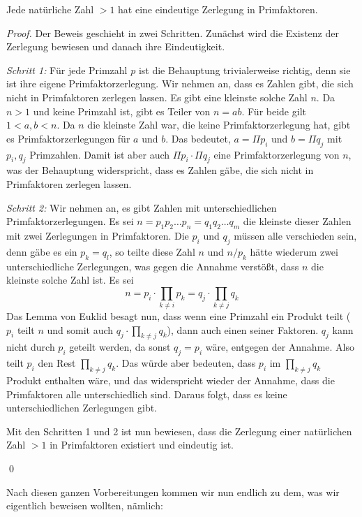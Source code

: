 \begin{lemma}\label{lem:prim}
Jede natürliche Zahl $>1$ hat eine eindeutige Zerlegung in Primfaktoren.
\end{lemma}
\begin{proof}
Der Beweis geschieht in zwei Schritten. Zunächst wird die Existenz der Zerlegung bewiesen und danach ihre Eindeutigkeit.

\noindent\textsl{Schritt 1:}
Für jede Primzahl $p$ ist die Behauptung trivialerweise richtig, denn sie ist ihre eigene Primfaktorzerlegung. 
Wir nehmen an, dass es Zahlen gibt, die sich nicht in Primfaktoren zerlegen lassen. Es gibt eine kleinste solche Zahl $n$. Da $n>1$ und keine Primzahl ist, gibt es Teiler von $n=ab$. Für beide gilt $1<a,b<n$. Da $n$ die kleinste Zahl war, die keine Primfaktorzerlegung hat, gibt es Primfaktorzerlegungen für $a$ und $b$. Das bedeutet, $a = \Pi p_i$ und $b=\Pi q_j$ mit $p_i,q_j$ Primzahlen. Damit ist aber auch $\Pi p_i \cdot \Pi q_j$ eine Primfaktorzerlegung von $n$, was der Behauptung widerspricht, dass es Zahlen gäbe, die sich nicht in Primfaktoren zerlegen lassen.

\noindent\textsl{Schritt 2:}
Wir nehmen an, es gibt Zahlen mit unterschiedlichen Primfaktorzerlegungen. Es sei $n=p_1 p_2 \dots p_n = q_1 q_2 \dots q_m$ die kleinste dieser Zahlen mit zwei Zerlegungen in Primfaktoren. Die $p_i$ und $q_j$ müssen alle verschieden sein, denn gäbe es ein $p_k=q_l$, so teilte diese Zahl $n$ und $n/p_k$ hätte wiederum zwei unterschiedliche Zerlegungen, was gegen die Annahme verstößt, dass $n$ die kleinste solche Zahl ist.
Es sei 
\[
n= p_i\cdot \prod_{k\ne i} p_k= q_j\cdot \prod_{k\ne j} q_k
\]
Das Lemma von Euklid besagt nun, dass wenn eine Primzahl ein Produkt teilt ($p_i$ teilt $n$ und somit auch $q_j\cdot \prod_{k\ne j} q_k$), dann auch einen seiner Faktoren. $q_j$ kann nicht durch $p_i$ geteilt werden, da sonst $q_j=p_i$ wäre, entgegen der Annahme. Also teilt $p_i$ den Rest $\prod_{k\ne j} q_k$. Das würde aber bedeuten, dass $p_i$ im $\prod_{k\ne j} q_k$ Produkt enthalten wäre, und das widerspricht wieder der Annahme, dass die Primfaktoren alle unterschiedlich sind. Daraus folgt, dass es keine unterschiedlichen Zerlegungen gibt.

Mit den Schritten 1 und 2 ist nun bewiesen, dass die Zerlegung einer natürlichen Zahl $>1$ in Primfaktoren existiert und eindeutig ist. 

\qed
\end{proof}

Nach diesen ganzen Vorbereitungen kommen wir nun endlich zu dem, was wir eigentlich beweisen wollten, nämlich:

